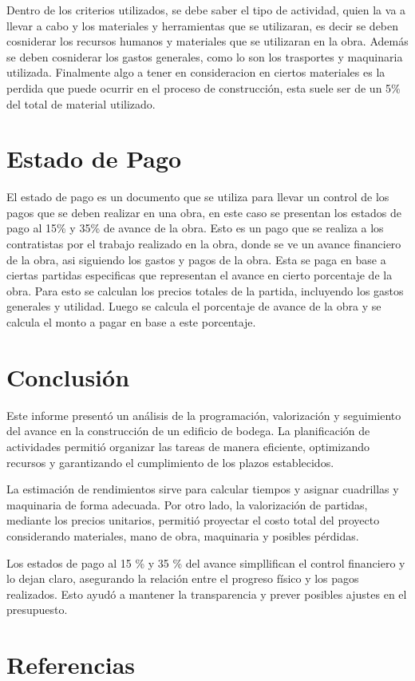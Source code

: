 \documentclass{article} %
\begin{document}
Dentro de los criterios utilizados, se debe saber el tipo de actividad, quien la va a llevar a cabo y los materiales y herramientas que se utilizaran, es decir se deben cosniderar los recursos humanos y materiales que se utilizaran en la obra. Además se deben cosniderar los gastos generales, como lo son los trasportes y maquinaria utilizada. Finalmente algo a tener en consideracion en ciertos materiales es la perdida que puede ocurrir en el proceso de construcción, esta suele ser de un 5\% del total de material utilizado.

\section{Estado de Pago}

El estado de pago es un documento que se utiliza para llevar un control de los pagos que se deben realizar en una obra, en este caso se presentan los estados de pago al 15\% y 35\% de avance de la obra. Esto es un pago que se realiza a los contratistas por el trabajo realizado en la obra, donde se ve un avance financiero de la obra, asi siguiendo los gastos y pagos de la obra. Esta se paga en base a ciertas partidas especificas que representan el avance en cierto porcentaje de la obra. Para esto se calculan los precios totales de la partida, incluyendo los gastos generales y utilidad. Luego se calcula el porcentaje de avance de la obra y se calcula el monto a pagar en base a este porcentaje.

\newpage
\section{Conclusión}

Este informe presentó un análisis de la programación, valorización y seguimiento del avance en la construcción de un edificio de bodega. La planificación de actividades permitió organizar las tareas de manera eficiente, optimizando recursos y garantizando el cumplimiento de los plazos establecidos.

La estimación de rendimientos sirve para calcular tiempos y asignar cuadrillas y maquinaria de forma adecuada. Por otro lado, la valorización de partidas, mediante los precios unitarios, permitió proyectar el costo total del proyecto considerando materiales, mano de obra, maquinaria y posibles pérdidas.

Los estados de pago al 15 \% y 35 \% del avance simpllifican el control financiero y lo dejan claro, asegurando la relación entre el progreso físico y los pagos realizados. Esto ayudó a mantener la transparencia y prever posibles ajustes en el presupuesto.

\newpage
\section{Referencias}
\nocite{*}


\end{document}
